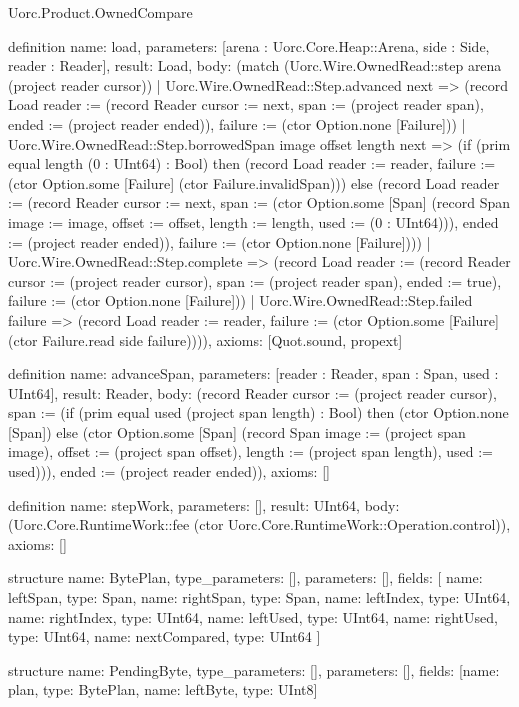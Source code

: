 \begin{lexlean}{Uorc.Product.OwnedCompare}
\begin{semanticmodule}
definition{
  name: load,
  parameters: [arena : Uorc.Core.Heap::Arena, side : Side, reader : Reader],
  result: Load,
  body: (match (Uorc.Wire.OwnedRead::step arena (project reader cursor))
    | Uorc.Wire.OwnedRead::Step.advanced next => (record Load {reader := (record Reader {cursor := next, span := (project reader span), ended := (project reader ended)}), failure := (ctor Option.none [Failure])})
    | Uorc.Wire.OwnedRead::Step.borrowedSpan image offset length next => (if (prim equal length (0 : UInt64) : Bool) then (record Load {reader := reader, failure := (ctor Option.some [Failure] (ctor Failure.invalidSpan))}) else (record Load {reader := (record Reader {cursor := next, span := (ctor Option.some [Span] (record Span {image := image, offset := offset, length := length, used := (0 : UInt64)})), ended := (project reader ended)}), failure := (ctor Option.none [Failure])}))
    | Uorc.Wire.OwnedRead::Step.complete => (record Load {reader := (record Reader {cursor := (project reader cursor), span := (project reader span), ended := true}), failure := (ctor Option.none [Failure])})
    | Uorc.Wire.OwnedRead::Step.failed failure => (record Load {reader := reader, failure := (ctor Option.some [Failure] (ctor Failure.read side failure))})),
  axioms: [Quot.sound, propext]
}

definition{
  name: advanceSpan,
  parameters: [reader : Reader, span : Span, used : UInt64],
  result: Reader,
  body: (record Reader {cursor := (project reader cursor), span := (if (prim equal used (project span length) : Bool) then (ctor Option.none [Span]) else (ctor Option.some [Span] (record Span {image := (project span image), offset := (project span offset), length := (project span length), used := used}))), ended := (project reader ended)}),
  axioms: []
}

definition{
  name: stepWork,
  parameters: [],
  result: UInt64,
  body: (Uorc.Core.RuntimeWork::fee (ctor Uorc.Core.RuntimeWork::Operation.control)),
  axioms: []
}

structure{
  name: BytePlan,
  type_parameters: [],
  parameters: [],
  fields: [
    {name: leftSpan, type: Span},
    {name: rightSpan, type: Span},
    {name: leftIndex, type: UInt64},
    {name: rightIndex, type: UInt64},
    {name: leftUsed, type: UInt64},
    {name: rightUsed, type: UInt64},
    {name: nextCompared, type: UInt64}
  ]
}

structure{
  name: PendingByte,
  type_parameters: [],
  parameters: [],
  fields: [{name: plan, type: BytePlan}, {name: leftByte, type: UInt8}]
}


\end{semanticmodule}
\end{lexlean}
